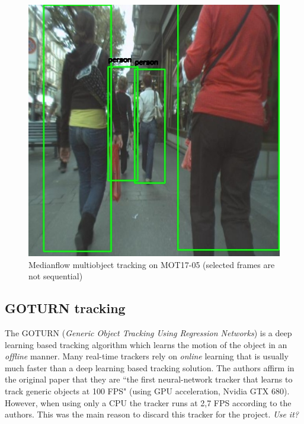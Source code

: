 \begin{figure}[H]
\begin{center}
\includegraphics[scale=0.25]{figures/659.jpg}
\caption{Medianflow multiobject tracking on MOT17-05 (selected frames are not sequential)}
\label{fig:medianflow_images}
\end{center}
\end{figure}
\subsection{GOTURN tracking}
The GOTURN (\textit{Generic Object Tracking Using Regression Networks}) is a deep learning based tracking algorithm which learns the motion of the object in an \textit{offline} manner. Many real-time trackers rely on \textit{online} learning that is usually much faster than a deep learning based tracking solution. The authors affirm in the original paper \cite{held2016learning} that they are ``the first neural-network tracker that learns to track generic objects at 100 FPS" (using GPU acceleration, Nvidia GTX 680). However, when using only a CPU the tracker runs at 2,7 FPS according to the authors. This was the main reason to discard this tracker for the project. \textit{Use it?} %
